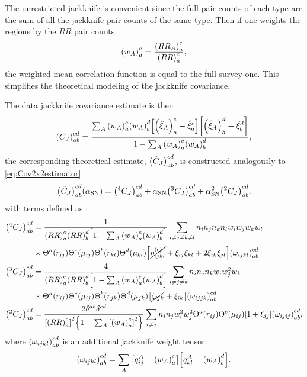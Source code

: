 The unrestricted jackknife is convenient since the full pair counts of each type are the sum of all the jackknife pair counts of the same type.
Then if one weights the regions by the $RR$ pair counts,
\begin{equation} \label{eq:jack-weights}
\qty(w_A)_a^c = \frac{\qty(RR_A)_a^c}{\qty(RR)_a^c},
\end{equation}
the weighted mean correlation function is equal to the full-survey one.
This simplifies the theoretical modeling of the jackknife covariance.

The data jackknife covariance estimate is then
\begin{equation} \label{eq:cov-jackknife-def}
\qty(C_J)_{ab}^{cd} = \frac{\sum_A \qty(w_A)_a^c \qty(w_A)_b^d \qty[\qty(\hat\xi_A)_a^c - \hat\xi_a^c] \qty[\qty(\hat\xi_A)_b^d - \hat\xi_b^d]}{1 - \sum_A \qty(w_A)_a^c \qty(w_A)_b^d},
\end{equation}
the corresponding theoretical estimate, $\qty(\tilde C_J)_{ab}^{cd}$, is constructed analogously to \cref{eq:Cov2x2estimator}:
\begin{equation} \label{eq:Cov2x2estimator-jack}
\qty(\tilde C_J)_{ab}^{cd} \qty(\alpha_{\rm SN}) = \qty(^4C_J)_{ab}^{cd} + \alpha_{\rm SN} \qty(^3C_J)_{ab}^{cd} + \alpha_{\rm SN}^2 \qty(^2C_J)_{ab}^{cd}.
\end{equation}
with terms defined as \citep{rascalC}:
\begin{align} \label{eq:Cov2x2_234_Point_Defs-jack}
\qty(^4C_J)_{ab}^{cd} &= \frac{1}{\qty(RR)_a^c \qty(RR)_b^d \qty[1 - \sum_A \qty(w_A)_a^c \qty(w_A)_b^d]} \sum_{i\neq j\neq k\neq l} n_i n_j n_k n_l w_i w_j w_k w_l \\ \nonumber
& \times \Theta^a(r_{ij}) \Theta^c(\mu_{ij}) \Theta^b(r_{kl}) \Theta^d(\mu_{kl}) \qty[\cancel{\eta^{({\rm c})}_{ijkl}} + \xi_{ij} \xi_{kl} + 2\xi_{ik} \xi_{jl}] \qty(\omega_{ijkl})_{ab}^{cd} \\ \nonumber
\qty(^3C_J)_{ab}^{cd} &= \frac{4}{\qty(RR)_a^c \qty(RR)_b^d \qty[1 - \sum_A \qty(w_A)_a^c \qty(w_A)_b^d]} \sum_{i\neq j\neq k} n_i n_j n_k w_i w_j^2 w_k \\ \nonumber
& \times \Theta^a(r_{ij}) \Theta^c(\mu_{ij}) \Theta^b(r_{jk}) \Theta^d(\mu_{jk}) \qty[\cancel{\zeta_{ijk}} + \xi_{ik}] \qty(\omega_{ijjk})_{ab}^{cd} \\ \nonumber
\qty(^2C_J)_{ab}^{cd} &= \frac{2\delta^{ab}\delta^{cd}}{\qty[\qty(RR)_a^c]^2 \qty{1 - \sum_A \qty[\qty(w_A)_a^c]^2}} \sum_{i\neq j} n_i n_j w_i^2 w_j^2 \Theta^a(r_{ij}) \Theta^c(\mu_{ij}) \qty[1+\xi_{ij}] \qty(\omega_{ijij})_{ab}^{cd},
\end{align}
where $\qty(\omega_{ijkl})_{ab}^{cd}$ is an additional jackknife weight tensor:
\begin{equation}
\qty(\omega_{ijkl})_{ab}^{cd} = \sum_A \qty[q^A_{ij} - \qty(w_A)_a^c] \qty[q^A_{kl} - \qty(w_A)_b^d].
\end{equation}

